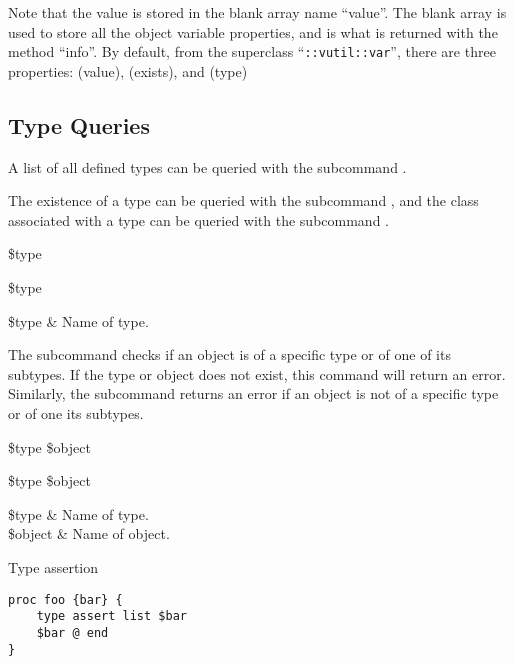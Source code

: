 \documentclass{article}
\begin{document}
Note that the value is stored in the blank array name ``value''. 
The blank array is used to store all the object variable properties, and is what is returned with the method ``info''.
By default, from the superclass ``\texttt{::vutil::var}'', there are three properties: (value), (exists), and (type)

\clearpage
\subsection{Type Queries}
A list of all defined types can be queried with the subcommand . 
\begin{syntax}
\end{syntax}

The existence of a type can be queried with the subcommand , and 
the class associated with a type can be queried with the subcommand . 
\begin{syntax}
 \$type
\end{syntax}
\begin{syntax}
 \$type
\end{syntax}
\begin{args}
\$type & Name of type. 
\end{args}

The subcommand  checks if an object is of a specific type or of one of its subtypes.
If the type or object does not exist, this command will return an error.
Similarly, the subcommand  returns an error if an object is not of a specific type or of one its subtypes.

\begin{syntax}
 \$type \$object
\end{syntax}
\begin{syntax}
 \$type \$object
\end{syntax}
\begin{args}
\$type & Name of type. \\
\$object & Name of object.
\end{args}

\begin{example}{Type assertion}
\begin{lstlisting}
proc foo {bar} {
    type assert list $bar
    $bar @ end
}
\end{lstlisting}
\end{example}
\end{document}
